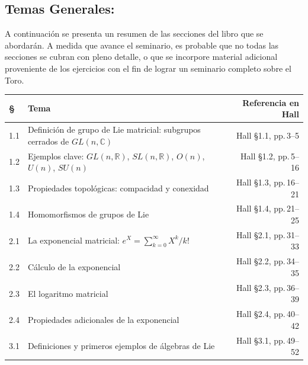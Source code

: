 \begin{assignment}[
  header=HeaderA,
  body=BodyA,
  title={Guia de Seminario Algebra Moderna},
  duedate={\today},
  toc=false,
  toctitle={},
  exlist=false
]
\section*{Temas Generales:}

A continuación se presenta un resumen de las secciones del libro que se abordarán. A medida que avance el seminario, es probable que no todas las secciones se cubran con pleno detalle, o que se incorpore material adicional proveniente de los ejercicios con el fin de lograr un seminario completo sobre el Toro.

\newpage

\begin{table}[H]
\centering
\renewcommand{\arraystretch}{1.45}
\begin{tabular}{@{} p{0.55cm} p{7.2cm} R @{}}
\toprule
\textbf{\S} & \textbf{Tema} & \textbf{Referencia en Hall} \\
\midrule
 
1.1 & Definición de grupo de Lie matricial:
      subgrupos cerrados de $GL(n,\mathbb{C})$
      & Hall \S1.1, pp.\,3--5 \\[4pt]
 
1.2 & Ejemplos clave: $GL(n,\mathbb{R})$, $SL(n,\mathbb{R})$,
      $O(n)$, $U(n)$, $SU(n)$
      & Hall \S1.2, pp.\,5--16 \\[4pt]
 
1.3 & Propiedades topológicas: compacidad y conexidad
      & Hall \S1.3, pp.\,16--21 \\[4pt]
 
1.4 & Homomorfismos de grupos de Lie
      & Hall \S1.4, pp.\,21--25 \\[6pt]
 
\midrule
 
2.1 & La exponencial matricial:
      $e^{X}=\sum_{k=0}^{\infty}X^{k}/k!$
      & Hall \S2.1, pp.\,31--33 \\[4pt]
 
2.2 & Cálculo de la exponencial
      & Hall \S2.2, pp.\,34--35 \\[4pt]
 
2.3 & El logaritmo matricial
      & Hall \S2.3, pp.\,36--39 \\[4pt]
 
2.4 & Propiedades adicionales de la exponencial
      & Hall \S2.4, pp.\,40--42 \\[6pt]
 
\midrule
 
3.1 & Definiciones y primeros ejemplos de álgebras de Lie
      & Hall \S3.1, pp.\,49--52 \\[4pt]
 

\end{tabular}
\end{table}
\end{assignment}
